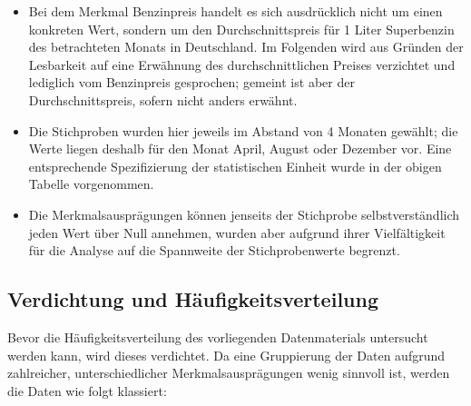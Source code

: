 \begin{itemize}
  \item Bei dem Merkmal Benzinpreis handelt es sich ausdrücklich nicht um einen konkreten Wert, sondern um den Durchschnittspreis für 1 Liter Superbenzin des betrachteten Monats in Deutschland. Im Folgenden wird aus Gründen der Lesbarkeit auf eine Erwähnung des durchschnittlichen Preises verzichtet und lediglich vom Benzinpreis gesprochen; gemeint ist aber der Durchschnittspreis, sofern nicht anders erwähnt.
  \item Die Stichproben wurden hier jeweils im Abstand von 4 Monaten gewählt; die Werte liegen deshalb für den Monat April, August oder Dezember vor. Eine entsprechende Spezifizierung der statistischen Einheit wurde in der obigen Tabelle vorgenommen.
  \item Die Merkmalsausprägungen können jenseits der Stichprobe selbstverständlich jeden Wert über Null annehmen, wurden aber aufgrund ihrer Vielfältigkeit für die Analyse auf die Spannweite der Stichprobenwerte begrenzt.
\end{itemize}
\pagebreak

\subsection{Verdichtung und Häufigkeitsverteilung}

Bevor die Häufigkeitsverteilung des vorliegenden Datenmaterials untersucht werden kann, wird dieses verdichtet. Da eine Gruppierung der Daten aufgrund zahlreicher, unterschiedlicher Merkmalsausprägungen wenig sinnvoll ist, werden die Daten wie folgt klassiert:

